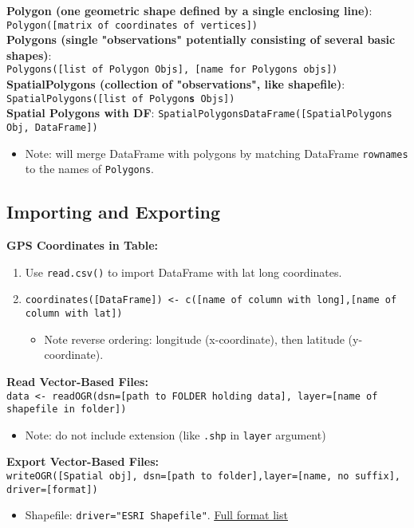 \documentclass[10pt]{article}
\begin{document}
\textbf{Polygon (one geometric shape defined by a single enclosing line)}: \\
\hspace*{1cm}\texttt{Polygon([matrix of coordinates of vertices])} \\
\textbf{Polygons (single "observations" potentially consisting of several basic shapes)}:\\ 
\hspace*{1cm} \texttt{Polygons([list of Polygon Objs], [name for Polygons objs])}\\
\textbf{SpatialPolygons (collection of "observations", like shapefile)}:\\
\hspace*{1cm} \texttt{SpatialPolygons([list of Polygon\textbf{s} Objs])}\\
\textbf{Spatial Polygons with DF}: \texttt{SpatialPolygonsDataFrame([SpatialPolygons Obj, DataFrame])}
\begin{itemize}
	\item Note: will merge DataFrame with polygons by matching DataFrame \texttt{rownames} to the names of \texttt{Polygons}.
\end{itemize}


\hrulefill 
\subsection*{Importing and Exporting}
\textbf{GPS Coordinates in Table:}
\begin{enumerate}
	\item Use \texttt{read.csv()} to import DataFrame with lat long coordinates.
	\item \texttt{coordinates([DataFrame]) <- c([name of column with long],[name of column with lat])}
	\begin{itemize}
		\item Note reverse ordering: longitude (x-coordinate), then latitude (y-coordinate).
	\end{itemize}
\end{enumerate}
\textbf{Read Vector-Based Files:}\\
\texttt{data <- readOGR(dsn=[path to FOLDER holding data], layer=[name of shapefile in folder])}
\begin{itemize}
	\item Note: do not include extension (like \texttt{.shp} in \texttt{layer} argument)
\end{itemize}
\textbf{Export Vector-Based Files:}\\
\texttt{writeOGR([Spatial obj], dsn=[path to folder],layer=[name, no suffix], driver=[format])}
\begin{itemize}
	\item Shapefile: \texttt{driver="ESRI Shapefile"}. \href{http://www.gdal.org/ogr_formats.html}{\underline{Full format list}}
\end{itemize}
\end{document}
